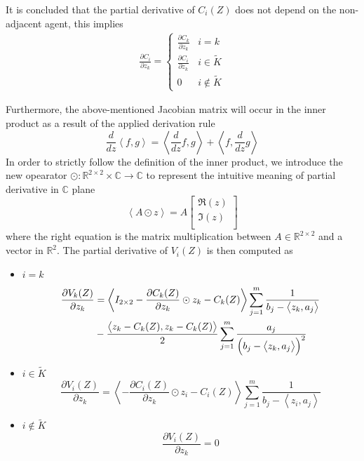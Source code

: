 \documentclass[journal]{IEEEtran}
\newcommand{\threepartdef}[6]
{
	\left\{
	\begin{array}{ll}
		#1 & #2 \\
		#3 & #4 \\
		#5 & #6 
	\end{array}
	\right.
}
\begin{document}
	
	It is concluded that the partial derivative of $C_i(Z)$ does not depend on the non-adjacent agent, this implies 
	\begin{equation} \label{eqn:dVidz}
	\begin{split}
	\frac{\partial C_i}{\partial z_k} = \threepartdef	{\frac{\partial C_k}{\partial z_k}}			{i = k}
	{\frac{\partial C_i}{\partial z_k}}			{i \in \tilde{K}}
	{0}											{i \notin \tilde{K}} 												
	\end{split}
	\end{equation}
	
	
	Furthermore, the above-mentioned Jacobian matrix will occur in the inner product as a result of the applied derivation rule 
	\[\frac{d}{dz}\left < f,g\right > = \left < \frac{d}{dz}f, g \right > + \left < f, \frac{d}{dz} g \right >\]
	In order to strictly follow the definition of the inner product, we introduce the new opearator $\odot: \mathbb{R}^{2 \times 2} \times \mathbb{C} \rightarrow \mathbb{C}$ to represent the intuitive meaning of partial derivative in $\mathbb{C}$ plane
	\[\left < A \odot z\right > = A \begin{bmatrix}
	\Re (z) \\
	\Im (z) \\
	\end{bmatrix} \]   
	where the right equation is the matrix multiplication between $A \in \mathbb{R}^{2\times2}$ and a vector in $\mathbb{R}^2$. The partial derivative of $V_i(Z)$ is then computed as
	\begin{itemize} [leftmargin=*]
		\item $ i = k $
		\begin{equation} \notag
		\begin{split}
		\frac{\partial V_k(Z)}{\partial z_k} & = \left<I_{2 \times 2} -\frac{\partial C_k(Z)}{\partial z_k} \odot z_k - C_k(Z)\right>     \sum^{m}_{j=1} \frac{1}{b_j - \left<z_k, a_j \right> } \\
		& - \frac{\left< z_k - C_k(Z), z_k - C_k(Z)\right>}{2} 					\sum^{m}_{j=1} \frac{a_j}{\left (b_j - \left<z_k, a_j \right>\right )^2} 
		\end{split}
		\end{equation}
		
		\item $ i \in \tilde{K} $
		\[\frac{\partial V_i(Z)}{\partial z_k} = \left<- \frac{\partial C_i(Z)}{\partial z_k} \odot z_i - C_i(Z)\right>     \sum^{m}_{j=1} \frac{1}{b_j - \left<z_i, a_j \right> }\]
		
		\item $ i \notin \tilde{K} $
		\[\frac{\partial V_i(Z)}{\partial z_k} = 0 \]
		
	\end{itemize}
	
\end{document}
